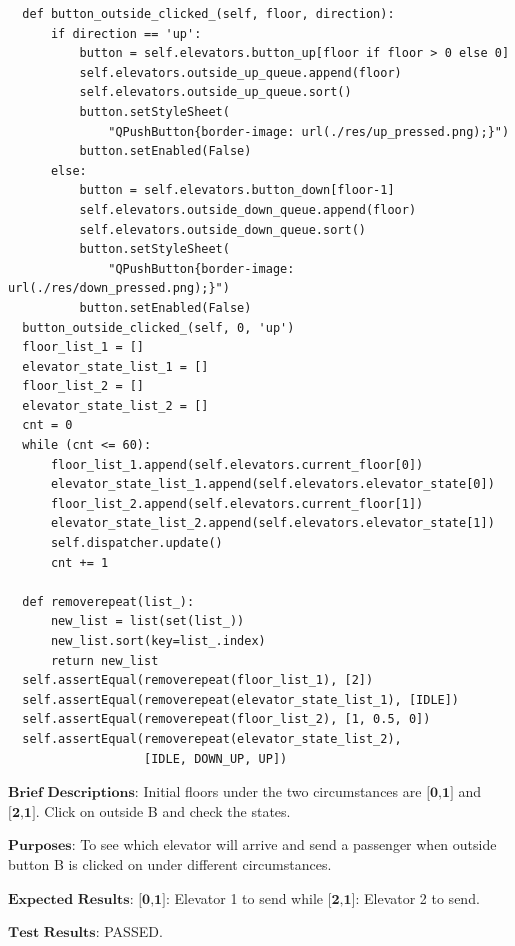 \documentclass{article}
\begin{document}
\begin{lstlisting}
  def button_outside_clicked_(self, floor, direction):
      if direction == 'up':
          button = self.elevators.button_up[floor if floor > 0 else 0]
          self.elevators.outside_up_queue.append(floor)
          self.elevators.outside_up_queue.sort()
          button.setStyleSheet(
              "QPushButton{border-image: url(./res/up_pressed.png);}")
          button.setEnabled(False)
      else:
          button = self.elevators.button_down[floor-1]
          self.elevators.outside_down_queue.append(floor)
          self.elevators.outside_down_queue.sort()
          button.setStyleSheet(
              "QPushButton{border-image: url(./res/down_pressed.png);}")
          button.setEnabled(False)
  button_outside_clicked_(self, 0, 'up')
  floor_list_1 = []
  elevator_state_list_1 = []
  floor_list_2 = []
  elevator_state_list_2 = []
  cnt = 0
  while (cnt <= 60):
      floor_list_1.append(self.elevators.current_floor[0])
      elevator_state_list_1.append(self.elevators.elevator_state[0])
      floor_list_2.append(self.elevators.current_floor[1])
      elevator_state_list_2.append(self.elevators.elevator_state[1])
      self.dispatcher.update()
      cnt += 1

  def removerepeat(list_):
      new_list = list(set(list_))
      new_list.sort(key=list_.index)
      return new_list
  self.assertEqual(removerepeat(floor_list_1), [2])
  self.assertEqual(removerepeat(elevator_state_list_1), [IDLE])
  self.assertEqual(removerepeat(floor_list_2), [1, 0.5, 0])
  self.assertEqual(removerepeat(elevator_state_list_2),
                   [IDLE, DOWN_UP, UP])
\end{lstlisting}

$\textbf{Brief Descriptions:}$
Initial floors under the two circumstances are $\textbf{[0,1]}$ and $\textbf{[2,1]}$. Click on outside B and check the states.

$\textbf{Purposes:}$
To see which elevator will arrive and send a passenger when outside button B is clicked on under different circumstances.

$\textbf{Expected Results:}$
$\textbf{[0,1]}$: Elevator 1 to send while $\textbf{[2,1]}$: Elevator 2 to send.

$\textbf{Test Results:}$
PASSED.
\end{document}
